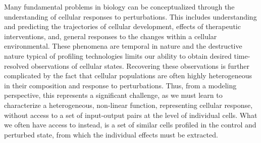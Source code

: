 Many fundamental problems in biology can be conceptualized through the understanding of cellular responses to perturbations.
This includes understanding and predicting the trajectories of cellular development, effects of therapeutic interventions, and, general responses to the changes within a cellular environmental.
These phenomena are temporal in nature and the destructive nature typical of profiling technologies limits our ability to obtain desired time-resolved observations of cellular states.
Recovering these observations is further complicated by the fact that cellular populations are often highly heterogeneous in their composition and response to perturbations.
Thus, from a modeling perspective, this represents a significant challenge, as we must learn to characterize a heterogeneous, non-linear function, representing cellular response, without access to a set of input-output pairs at the level of individual cells.
What we often have access to instead, is a set of similar cells profiled in the control and perturbed state, from which the individual effects must be extracted.

